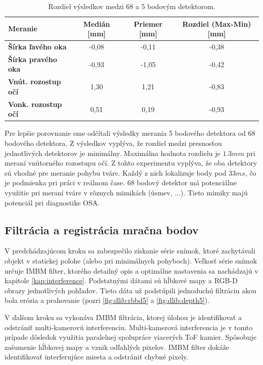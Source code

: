 \begin{table}[H]
	\caption{\label{tab:dlib:resulrs} Rozdiel výsledkov medzi 68 a 5 bodovým detektorom.}
	\centering
	\begin{tabular}{lccc}
		\toprule
		\textbf{Meranie} & \textbf{Medián [mm]} & \textbf{Priemer [mm]} & \textbf{Rozdiel (Max-Min) [mm]} \\ 
		\midrule
		\textbf{Šírka ľavého oka} 	& -0,08 & -0,11	& -0,38 \\
		\textbf{Šírka pravého oka} 	& -0,93	& -1,05 & -0,42 \\
		\textbf{Vnút. rozostup očí} 	& 1,30	& 1,21 & -0,83 \\
		\textbf{Vonk. rozostup očí} 	& 0,51	& 0,19 & -0,93 \\
		\bottomrule
	\end{tabular}
\end{table}

Pre lepšie porovnanie sme odčítali výsledky merania 5 bodového detektora od 68 bodového detektora. Z výsledkov vyplýva, že rozdiel medzi presnosťou jednotlivých detektorov je minimálny. Maximálna hodnota rozdielu je $1.3mm$ pri meraní vnútorného rozostupu očí. Z tohto experimentu vyplýva, že oba detektory sú vhodné pre meranie pohybu tváre. Každý z nich lokalizuje body pod $33ms$, čo je podmienka pri práci v reálnom čase. 68 bodový detektor má potenciálne využitie pri meraní tváre v rôznych mimikách (úsmev, ...). Tieto mimiky majú potenciál pri diagnostike OSA.
  

\subsection{Filtrácia a registrácia mračna bodov}
\label{sec:filtration}
V predchádzajúcom kroku sa zabezpečilo získanie série snímok, ktoré zachytávali objekt v statickej polohe (alebo pri minimálnych pohyboch). Veľkosť série snímok určuje IMBM filter, ktorého detailný opis a optimálne nastavenia sa nachádzajú v kapitole \ref{kap:interference}. Podstatnými dátami sú hĺbkové mapy a RGB-D obrazy jednotlivých pohľadov. Tieto dáta už podstúpili jednoduchú filtráciu akou bola erózia a prahovanie (pozri \ref{fig:dlib:rbbd5} a \ref{fig:dlib:depth5}). 

V ďalšom kroku sa vykonáva IMBM filtrácia, ktorej úlohou je identifikovať a odstrániť multi-kamerovú interferenciu. Multi-kamerová interferencia je v tomto prípade dôsledok využitia paralelnej spolupráce viacerých ToF kamier. Spôsobuje zašumenie hĺbkovej mapy a vznik odľahlých pixelov. IMBM filter dokáže identifikovať interferujúce miesta a odstrániť chybné pixely. 

